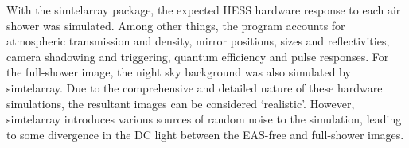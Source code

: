 \documentclass[11pt]{article}
\begin{document}
With the sim\textunderscore telarray package, the expected HESS hardware response to each air shower was simulated. Among other things, the program accounts for atmospheric transmission and density, mirror positions, sizes and reflectivities, camera shadowing and triggering, quantum efficiency and pulse responses. For the full-shower image, the night sky background was also simulated by sim\textunderscore telarray. Due to the comprehensive and detailed nature of these hardware simulations, the resultant images can be considered \textquoteleft realistic'.  However, sim\textunderscore telarray introduces various sources of random noise to the simulation, leading to some divergence in the DC light between the EAS-free and full-shower images.

\begin{figure}
\centering
\begin{minipage}{0.45\textwidth}
\centering

\end{minipage}
\end{figure}
\end{document}
